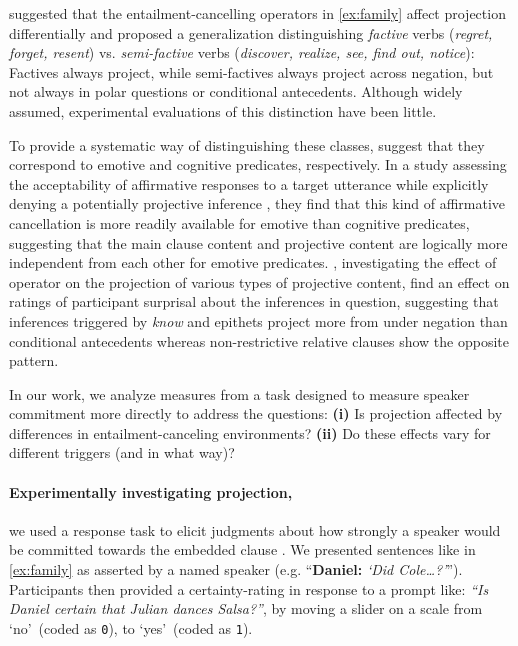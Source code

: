 \documentclass[12pt, a4paper]{scrartcl}
\begin{document}
	\vspace{-.4\baselineskip}
	\citet{karttunen_observations_1971} suggested that the entailment-cancelling operators in \ref{ex:family} affect projection differentially and proposed a generalization distinguishing \emph{factive} verbs (\emph{regret, forget, resent}) vs. \emph{semi-factive} verbs (\emph{discover, realize, see, find out, notice}): Factives always project, while semi-factives always project across negation, but not always in polar questions or conditional antecedents. Although widely assumed, experimental evaluations of this distinction have been little. 

	To provide a systematic way of distinguishing these classes, \cite{djarv_cognitive_2018} suggest that they correspond to emotive and cognitive predicates, respectively. In a study assessing the acceptability of affirmative responses to a target utterance while explicitly denying a potentially projective inference \citep[based on][]{cummins_experimental_2012}, they find that this kind of affirmative cancellation is more readily available for emotive than cognitive predicates, suggesting that the main clause content and projective content are logically more independent from each other for emotive predicates. \cite{smith_relationship_2014}, investigating the effect of operator on the projection of various types of projective content, find an effect on ratings of participant surprisal about the inferences in question, suggesting that inferences triggered by \emph{know} and epithets project more from under negation than conditional antecedents whereas non-restrictive relative clauses show the opposite pattern.

	In our work, we analyze measures from a task designed to measure speaker commitment more directly to address the questions: \textbf{(i)} Is projection affected by differences in entailment-canceling environments? \textbf{(ii)} Do these effects vary for different triggers (and in what way)?

\vspace{-\baselineskip}
\paragraph{Experimentally investigating projection,} \hspace{-1em}
	we used a response task to elicit judgments about how strongly a speaker would be committed towards the embedded clause \citep[from][]{tonhauser_prosodic_2016}. We presented sentences like in \ref{ex:family} as asserted by a named speaker (e.g. “\textbf{Daniel:} \emph{\lq Did Cole\dots?\rq}”). Participants then provided a certainty-rating in response to a prompt like: \emph{“Is Daniel certain that Julian dances Salsa?”}, by moving a slider on a scale from \lq no\rq\ (coded as \texttt{0}), to \lq yes\rq\ (coded as \texttt{1}). 
\end{document}
